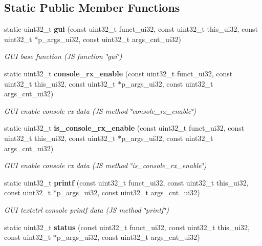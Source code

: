 \subsection*{Static Public Member Functions}
\begin{DoxyCompactItemize}
\item 
static uint32\+\_\+t \textbf{ gui} (const uint32\+\_\+t funct\+\_\+ui32, const uint32\+\_\+t this\+\_\+ui32, const uint32\+\_\+t $\ast$p\+\_\+args\+\_\+ui32, const uint32\+\_\+t args\+\_\+cnt\+\_\+ui32)
\begin{DoxyCompactList}\small\item\em G\+UI base function (JS function \char`\"{}gui\char`\"{}) \end{DoxyCompactList}\item 
static uint32\+\_\+t \textbf{ console\+\_\+rx\+\_\+enable} (const uint32\+\_\+t funct\+\_\+ui32, const uint32\+\_\+t this\+\_\+ui32, const uint32\+\_\+t $\ast$p\+\_\+args\+\_\+ui32, const uint32\+\_\+t args\+\_\+cnt\+\_\+ui32)
\begin{DoxyCompactList}\small\item\em G\+UI enable console rx data (JS method \char`\"{}console\+\_\+rx\+\_\+enable\char`\"{}) \end{DoxyCompactList}\item 
static uint32\+\_\+t \textbf{ is\+\_\+console\+\_\+rx\+\_\+enable} (const uint32\+\_\+t funct\+\_\+ui32, const uint32\+\_\+t this\+\_\+ui32, const uint32\+\_\+t $\ast$p\+\_\+args\+\_\+ui32, const uint32\+\_\+t args\+\_\+cnt\+\_\+ui32)
\begin{DoxyCompactList}\small\item\em G\+UI enable console rx data (JS method \char`\"{}is\+\_\+console\+\_\+rx\+\_\+enable\char`\"{}) \end{DoxyCompactList}\item 
static uint32\+\_\+t \textbf{ printf} (const uint32\+\_\+t funct\+\_\+ui32, const uint32\+\_\+t this\+\_\+ui32, const uint32\+\_\+t $\ast$p\+\_\+args\+\_\+ui32, const uint32\+\_\+t args\+\_\+cnt\+\_\+ui32)
\begin{DoxyCompactList}\small\item\em G\+UI textctrl console printf data (JS method \char`\"{}printf\char`\"{}) \end{DoxyCompactList}\item 
static uint32\+\_\+t \textbf{ status} (const uint32\+\_\+t funct\+\_\+ui32, const uint32\+\_\+t this\+\_\+ui32, const uint32\+\_\+t $\ast$p\+\_\+args\+\_\+ui32, const uint32\+\_\+t args\+\_\+cnt\+\_\+ui32)

\end{DoxyCompactItemize}
